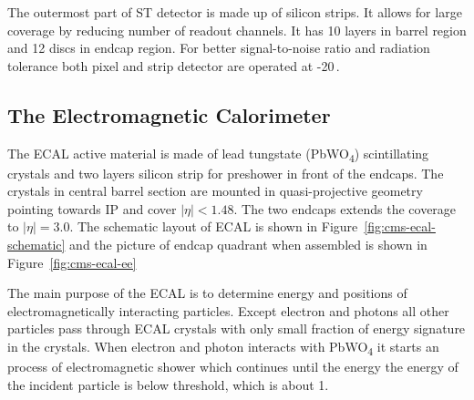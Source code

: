 The outermost part of \gls{ST} detector is made up of silicon strips. It allows for large
coverage by reducing number of readout channels. It has 10 layers in barrel region
and 12 discs in endcap region. For better signal-to-noise ratio and radiation
tolerance both pixel and strip detector are operated at -20\,\de{}\xspace.

\subsection{
  The Electromagnetic Calorimeter
}

The \gls{ECAL} active material is made of lead tungstate (PbWO\textsubscript{4})
scintillating crystals and two layers silicon strip for preshower
in front of the endcaps. The crystals in central barrel section are mounted
in quasi-projective geometry pointing towards \gls{IP} and cover
\( |\eta| < 1.48 \). The two endcaps extends the coverage to
\( |\eta| = 3.0 \). The schematic layout of \gls{ECAL} is shown in Figure~\ref{fig:cms-ecal-schematic}
and the picture of endcap quadrant when assembled is shown in Figure~\ref{fig:cms-ecal-ee}

The main purpose of the \gls{ECAL} is to determine energy and positions of
electromagnetically interacting particles.
Except electron and photons all other particles pass
through \gls{ECAL} crystals with only small fraction of energy signature in the crystals.
When electron and photon interacts with PbWO\textsubscript{4} it starts an process
of electromagnetic shower which continues until the energy the energy of the incident
particle is below threshold, which is about 1\MeV{}.

